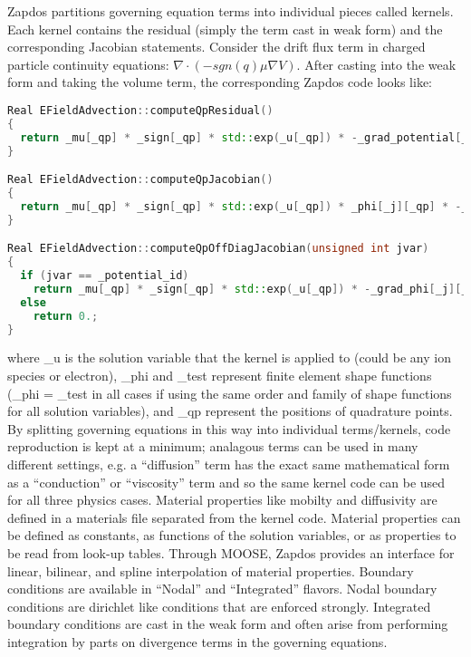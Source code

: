 Zapdos partitions governing equation terms into individual pieces called kernels. Each kernel contains the residual (simply the term cast in weak form) and the corresponding Jacobian statements. Consider the drift flux term in charged particle continuity equations: $\nabla\cdot\left(-sgn(q)\mu\nabla V\right)$. After casting into the weak form and taking the volume term, the corresponding Zapdos code looks like:

\begin{lstlisting}[language=C++]
Real EFieldAdvection::computeQpResidual()
{
  return _mu[_qp] * _sign[_qp] * std::exp(_u[_qp]) * -_grad_potential[_qp] * -_grad_test[_i][_qp];
}

Real EFieldAdvection::computeQpJacobian()
{
  return _mu[_qp] * _sign[_qp] * std::exp(_u[_qp]) * _phi[_j][_qp] * -_grad_potential[_qp] * -_grad_test[_i][_qp];
}

Real EFieldAdvection::computeQpOffDiagJacobian(unsigned int jvar)
{
  if (jvar == _potential_id)
    return _mu[_qp] * _sign[_qp] * std::exp(_u[_qp]) * -_grad_phi[_j][_qp] * -_grad_test[_i][_qp];
  else
    return 0.;
}
\end{lstlisting}

where \_u is the solution variable that the kernel is applied to (could be any ion species or electron), \_phi and \_test represent finite element shape functions (\_phi = \_test in all cases if using the same order and family of shape functions for all solution variables), and \_qp represent the positions of quadrature points. By splitting governing equations in this way into individual terms/kernels, code reproduction is kept at a minimum; analagous terms can be used in many different settings, e.g. a ``diffusion'' term has the exact same mathematical form as a ``conduction'' or ``viscosity'' term and so the same kernel code can be used for all three physics cases. Material properties like mobilty and diffusivity are defined in a materials file separated from the kernel code. Material properties can be defined as constants, as functions of the solution variables, or as properties to be read from look-up tables. Through MOOSE, Zapdos provides an interface for linear, bilinear, and spline interpolation of material properties. Boundary conditions are available in ``Nodal'' and ``Integrated'' flavors. Nodal boundary conditions are dirichlet like conditions that are enforced strongly. Integrated boundary conditions are cast in the weak form and often arise from performing integration by parts on divergence terms in the governing equations.

